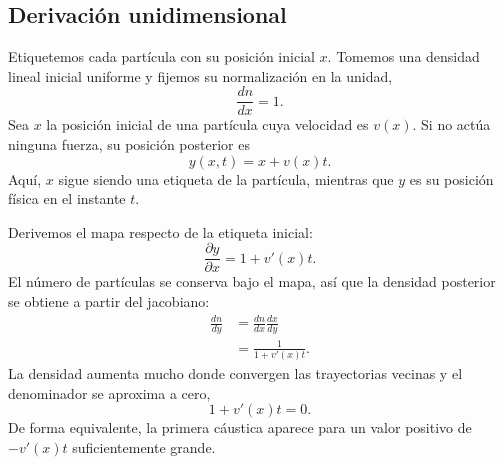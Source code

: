 \subsection{Derivación unidimensional}

Etiquetemos cada partícula con su posición inicial \(x\). Tomemos una densidad lineal inicial uniforme y fijemos su normalización en la unidad,
\begin{equation}
\frac{dn}{dx}=1.
\label{eq:c09-initial-density}
\end{equation}
Sea \(x\) la posición inicial de una partícula cuya velocidad es \(v(x)\). Si no actúa ninguna fuerza, su posición posterior es
\begin{equation}
y(x,t)=x+v(x)t.
\label{eq:c09-ballistic-map}
\end{equation}
Aquí, \(x\) sigue siendo una etiqueta de la partícula, mientras que \(y\) es su posición física en el instante \(t\).

Derivemos el mapa respecto de la etiqueta inicial:
\begin{equation}
\frac{\partial y}{\partial x}
=1+v'(x)t.
\label{eq:c09-jacobian}
\end{equation}
El número de partículas se conserva bajo el mapa, así que la densidad posterior se obtiene a partir del jacobiano:
\begin{align}
\frac{dn}{dy}
&=
\frac{dn}{dx}\frac{dx}{dy}\\
&=
\frac{1}{1+v'(x)t}.
\label{eq:c09-caustic-density}
\end{align}
La densidad aumenta mucho donde convergen las trayectorias vecinas y el denominador se aproxima a cero,
\begin{equation}
1+v'(x)t=0.
\label{eq:c09-caustic-condition}
\end{equation}
De forma equivalente, la primera cáustica aparece para un valor positivo de \(-v'(x)t\) suficientemente grande.

